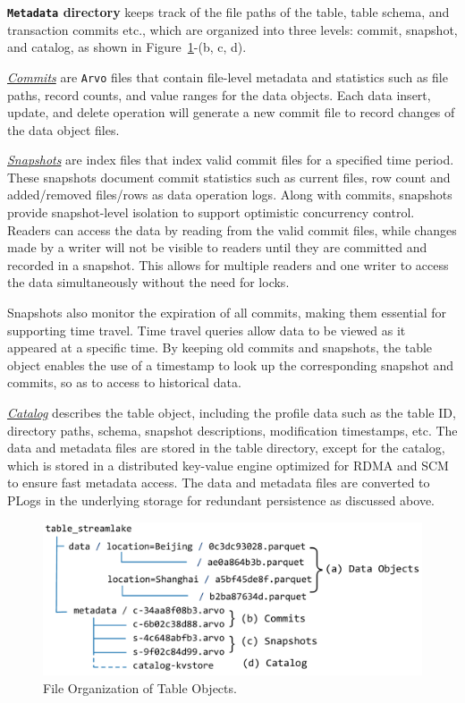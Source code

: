 \noindent \textbf{\texttt{Metadata} directory}  keeps track of the file paths of the table, table schema,  and transaction commits etc., which are organized into three levels: commit, snapshot, and catalog, as shown in Figure~\ref{fig:tableobject}-(b, c, d).

 \noindent \underline{\textit{Commits}} are \texttt{Arvo} files that contain file-level metadata and statistics such as file paths, record counts, and value ranges for the data objects. Each data insert, update, and delete operation will generate a new commit file to record changes of the data object files.


\noindent \underline{\textit{Snapshots}} are index files that index  valid commit files for a specified time period. These snapshots document commit statistics such as current files, row count and added/removed files/rows as data operation logs. Along with commits, snapshots provide snapshot-level isolation to support optimistic concurrency control. Readers can access the data by reading from the valid commit files, while changes made by a writer will not be visible to readers until they are committed and recorded in a snapshot. This allows for multiple readers and one writer to access the data simultaneously without the need for locks. 

Snapshots also monitor the expiration of all commits, making them essential for supporting time travel. Time travel queries allow data to be viewed as it appeared at a specific time. By keeping old commits and snapshots, the table object enables the use of a timestamp to look up the corresponding snapshot and commits, so as to access to historical data.

\noindent \underline{\textit{Catalog}}  describes the table object, including the profile data  such as the table ID, directory paths, schema, snapshot descriptions, modification timestamps, etc. The data and metadata files are stored in the table directory, except for the catalog, which is stored in a distributed key-value engine optimized for RDMA and SCM to ensure fast metadata access. The data and metadata files are converted to PLogs in the underlying storage for redundant persistence as discussed above.



\begin{figure}[htbp]
	
	\includegraphics[scale=0.3]{figures/tableobjects}
	\centering
	\vspace{-2em}
	\caption{File Organization of \sys Table Objects.}
	\label{fig:tableobject}
	\vspace{-2em}
\end{figure}


















